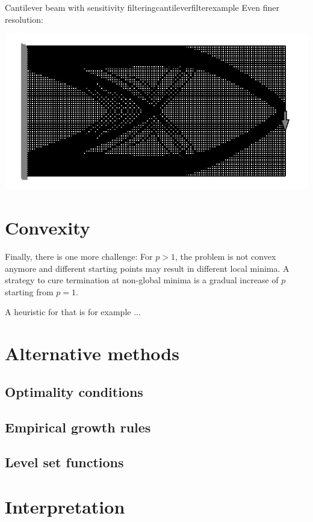 \begin{example}{Cantilever beam  with sensitivity filtering}{cantileverfilterexample}
    Even finer resolution:
    \begin{center}
        \includegraphics[width=\linewidth]{figures/cantilever_fem_optimized_binary_extra_fine.pdf}
    \end{center}
\end{example}


\section{Convexity}
Finally, there is one more challenge: For $p>1$, the problem is not convex anymore and different starting points may result in different local minima. A strategy to cure termination at non-global minima is a gradual increase of $p$ starting from $p=1$.

A heuristic for that is for example ...

\section{Alternative methods}
\subsection{Optimality conditions}
\subsection{Empirical growth rules}
\subsection{Level set functions}

\section{Interpretation}



 